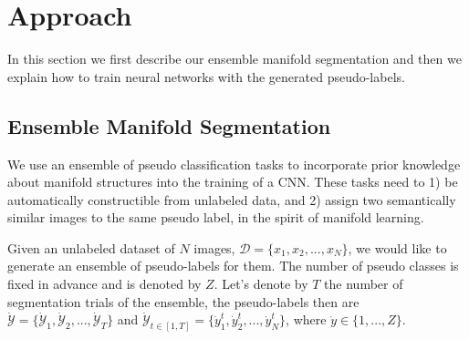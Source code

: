 \documentclass{bmvc2k}
\begin{document}





\section{Approach} 
\label{sec:method}

In this section we first describe our ensemble manifold segmentation and then we explain how to train neural networks with the generated
pseudo-labels.

\noindent
\subsection{Ensemble Manifold Segmentation}
\label{sec:seg} 

We use an ensemble of pseudo classification tasks to incorporate prior
knowledge about manifold structures into the training of a CNN. These tasks 
need to 1) be automatically constructible from unlabeled data, and 
2)  assign two semantically 
similar images to the same pseudo label, in the spirit of manifold learning.

Given an unlabeled dataset of $N$ images, $\mathcal{D}=\{x_1, x_2, ...,
x_N\}$, we would like to generate an ensemble of pseudo-labels for
them. The number of pseudo classes is fixed in advance and is denoted by $Z$.  
Let's denote by $T$ the number of segmentation trials of the ensemble, the pseudo-labels then are $\dot{\mathcal{Y}}=\{\dot{\mathcal{Y}}_1,
\dot{\mathcal{Y}}_2, ..., \dot{\mathcal{Y}}_T\}$ and $\dot{\mathcal{Y}}_{t \in [1,T]}=\{ \dot{y}_1^t, \dot{y}_2^t, ..., \dot{y}_N^t \}$,
where $\dot{y} \in \{1, ..., Z\}$. 
\end{document}
